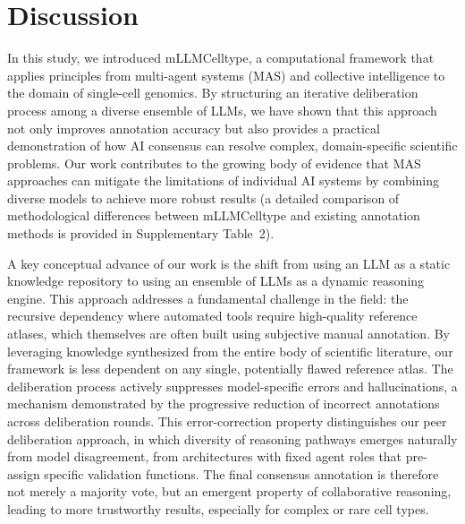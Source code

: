 \documentclass[pdflatex,sn-nature]{sn-jnl}%
\theoremstyle{thmstyleone}%
\theoremstyle{thmstyletwo}%
\theoremstyle{thmstylethree}%
\begin{document}
\section{Discussion}
In this study, we introduced mLLMCelltype, a computational framework that applies principles from multi-agent systems (MAS) and collective intelligence to the domain of single-cell genomics. By structuring an iterative deliberation process among a diverse ensemble of LLMs, we have shown that this approach not only improves annotation accuracy but also provides a practical demonstration of how AI consensus can resolve complex, domain-specific scientific problems. Our work contributes to the growing body of evidence that MAS approaches can mitigate the limitations of individual AI systems by combining diverse models to achieve more robust results (a detailed comparison of methodological differences between mLLMCelltype and existing annotation methods is provided in Supplementary Table~2).

A key conceptual advance of our work is the shift from using an LLM as a static knowledge repository to using an ensemble of LLMs as a dynamic reasoning engine. This approach addresses a fundamental challenge in the field: the recursive dependency where automated tools require high-quality reference atlases, which themselves are often built using subjective manual annotation\cite{luecken2021benchmarking}. By leveraging knowledge synthesized from the entire body of scientific literature, our framework is less dependent on any single, potentially flawed reference atlas. The deliberation process actively suppresses model-specific errors and hallucinations, a mechanism demonstrated by the progressive reduction of incorrect annotations across deliberation rounds. This error-correction property distinguishes our peer deliberation approach, in which diversity of reasoning pathways emerges naturally from model disagreement, from architectures with fixed agent roles\cite{xie2024cassia} that pre-assign specific validation functions. The final consensus annotation is therefore not merely a majority vote, but an emergent property of collaborative reasoning, leading to more trustworthy results, especially for complex or rare cell types.
\end{document}
